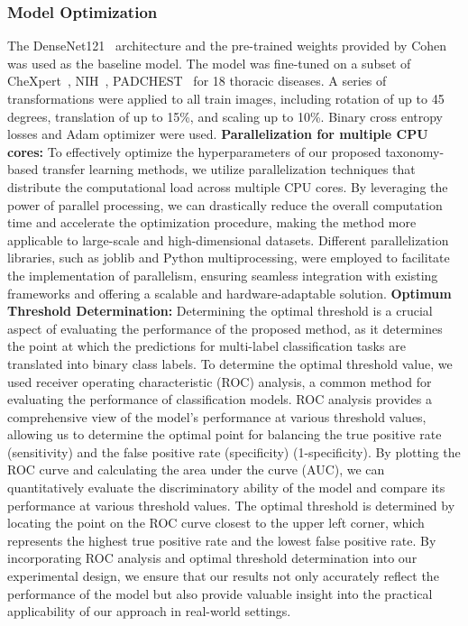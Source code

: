 \subsubsection{Model Optimization}
The DenseNet121~\cite{huang_Densely_2017} architecture and the pre-trained weights provided by Cohen~\cite{cohen_TorchXRayVision_2022} was used as the baseline model. The model was fine-tuned on a subset of CheXpert~\cite{irvin_CheXpert_2019}, NIH~\cite{wang_ChestXRay8_2017}, PADCHEST~\cite{bustos_Padchest_2020} for 18 thoracic diseases. A series of transformations were applied to all train images, including rotation of up to 45 degrees, translation of up to 15\%, and scaling up to 10\%. Binary cross entropy losses and Adam optimizer were used.
\textbf{Parallelization for multiple CPU cores: } To effectively optimize the hyperparameters of our proposed taxonomy-based transfer learning methods, we utilize parallelization techniques that distribute the computational load across multiple CPU cores. By leveraging the power of parallel processing, we can drastically reduce the overall computation time and accelerate the optimization procedure, making the method more applicable to large-scale and high-dimensional datasets. Different parallelization libraries, such as joblib and Python multiprocessing, were employed to facilitate the implementation of parallelism, ensuring seamless integration with existing frameworks and offering a scalable and hardware-adaptable solution.
\textbf{Optimum Threshold Determination: } Determining the optimal threshold is a crucial aspect of evaluating the performance of the proposed method, as it determines the point at which the predictions for multi-label classification tasks are translated into binary class labels. To determine the optimal threshold value, we used receiver operating characteristic (ROC) analysis, a common method for evaluating the performance of classification models. ROC analysis provides a comprehensive view of the model's performance at various threshold values, allowing us to determine the optimal point for balancing the true positive rate (sensitivity) and the false positive rate (specificity) (1-specificity). By plotting the ROC curve and calculating the area under the curve (AUC), we can quantitatively evaluate the discriminatory ability of the model and compare its performance at various threshold values. The optimal threshold is determined by locating the point on the ROC curve closest to the upper left corner, which represents the highest true positive rate and the lowest false positive rate. By incorporating ROC analysis and optimal threshold determination into our experimental design, we ensure that our results not only accurately reflect the performance of the model but also provide valuable insight into the practical applicability of our approach in real-world settings.
